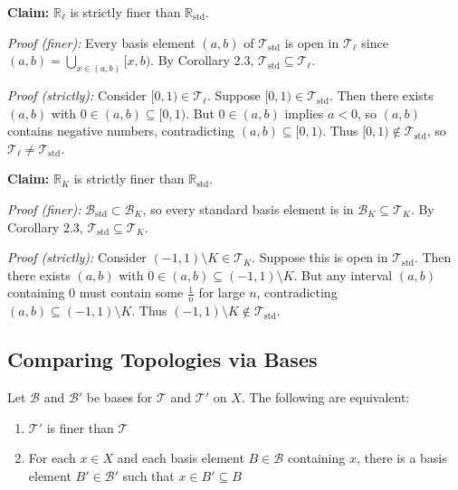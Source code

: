 \documentclass[11pt]{report}
\begin{document}
\begin{exbox}
\textbf{Claim:} $\mathbb{R}_\ell$ is strictly finer than $\mathbb{R}_{\text{std}}$.

\textit{Proof (finer):} Every basis element $(a,b)$ of $\mathcal{T}_{\text{std}}$ is open in $\mathcal{T}_\ell$ since $(a,b) = \bigcup_{x \in (a,b)} [x, b)$. By Corollary 2.3, $\mathcal{T}_{\text{std}} \subseteq \mathcal{T}_\ell$.

\textit{Proof (strictly):} Consider $[0,1) \in \mathcal{T}_\ell$. Suppose $[0,1) \in \mathcal{T}_{\text{std}}$. Then there exists $(a,b)$ with $0 \in (a,b) \subseteq [0,1)$. But $0 \in (a,b)$ implies $a < 0$, so $(a,b)$ contains negative numbers, contradicting $(a,b) \subseteq [0,1)$. Thus $[0,1) \notin \mathcal{T}_{\text{std}}$, so $\mathcal{T}_\ell \neq \mathcal{T}_{\text{std}}$.

\textbf{Claim:} $\mathbb{R}_K$ is strictly finer than $\mathbb{R}_{\text{std}}$.

\textit{Proof (finer):} $\mathcal{B}_{\text{std}} \subset \mathcal{B}_K$, so every standard basis element is in $\mathcal{B}_K \subseteq \mathcal{T}_K$. By Corollary 2.3, $\mathcal{T}_{\text{std}} \subseteq \mathcal{T}_K$.

\textit{Proof (strictly):} Consider $(-1,1) \setminus K \in \mathcal{T}_K$. Suppose this is open in $\mathcal{T}_{\text{std}}$. Then there exists $(a,b)$ with $0 \in (a,b) \subseteq (-1,1) \setminus K$. But any interval $(a,b)$ containing $0$ must contain some $\frac{1}{n}$ for large $n$, contradicting $(a,b) \subseteq (-1,1) \setminus K$. Thus $(-1,1) \setminus K \notin \mathcal{T}_{\text{std}}$.
\end{exbox}

\subsection{Comparing Topologies via Bases}

\begin{lembox}
Let $\mathcal{B}$ and $\mathcal{B}'$ be bases for $\mathcal{T}$ and $\mathcal{T}'$ on $X$. The following are equivalent:
\begin{enumerate}
    \item $\mathcal{T}'$ is finer than $\mathcal{T}$
    \item For each $x \in X$ and each basis element $B \in \mathcal{B}$ containing $x$, there is a basis element $B' \in \mathcal{B}'$ such that $x \in B' \subseteq B$
\end{enumerate}
\end{lembox}
\end{document}
